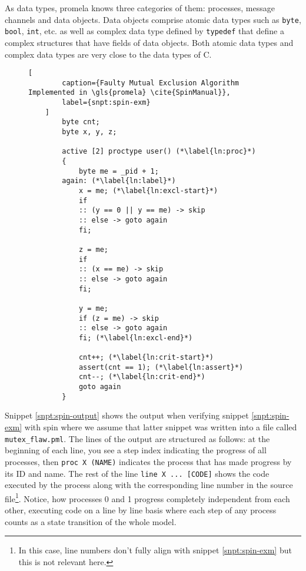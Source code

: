 As data types, \gls{promela} knows three categories of them: processes, message channels and data objects.
Data objects comprise atomic data types such as \lstinline{byte}, \lstinline{bool}, \lstinline{int}, etc. as well as complex data type defined by \lstinline{typedef} that define a complex structures that have fields of data objects.
Both atomic data types and complex data types are very close to the data types of C.

\begin{figure}
    \begin{lstlisting}[
        caption={Faulty Mutual Exclusion Algorithm Implemented in \gls{promela} \cite{SpinManual}},
        label={snpt:spin-exm}
    ]
        byte cnt;
        byte x, y, z;

        active [2] proctype user() (*\label{ln:proc}*)
        {
            byte me = _pid + 1;
        again: (*\label{ln:label}*)
            x = me; (*\label{ln:excl-start}*)
            if
            :: (y == 0 || y == me) -> skip
            :: else -> goto again
            fi;

            z = me;
            if
            :: (x == me) -> skip
            :: else -> goto again
            fi;

            y = me;
            if (z = me) -> skip
            :: else -> goto again
            fi; (*\label{ln:excl-end}*)

            cnt++; (*\label{ln:crit-start}*)
            assert(cnt == 1); (*\label{ln:assert}*)
            cnt--; (*\label{ln:crit-end}*)
            goto again
        }
    \end{lstlisting}
\end{figure}

Snippet \ref{snpt:spin-output} shows the output when verifying snippet \ref{snpt:spin-exm} with \gls{spin} where we assume that latter snippet was written into a file called \lstinline{mutex_flaw.pml}.
The lines of the output are structured as follows: at the beginning of each line, you see a step index indicating the progress of all processes, then \lstinline{proc X (NAME)} indicates the process that has made progress by its ID and name.
The rest of the line \lstinline{line X ... [CODE]} shows the code executed by the process along with the corresponding line number in the source file\footnote{%
    In this case, line numbers don't fully align with snippet \ref{snpt:spin-exm} but this is not relevant here.
}.
Notice, how processes 0 and 1 progress completely independent from each other, executing code on a line by line basis where each step of any process counts as a state transition of the whole model.

